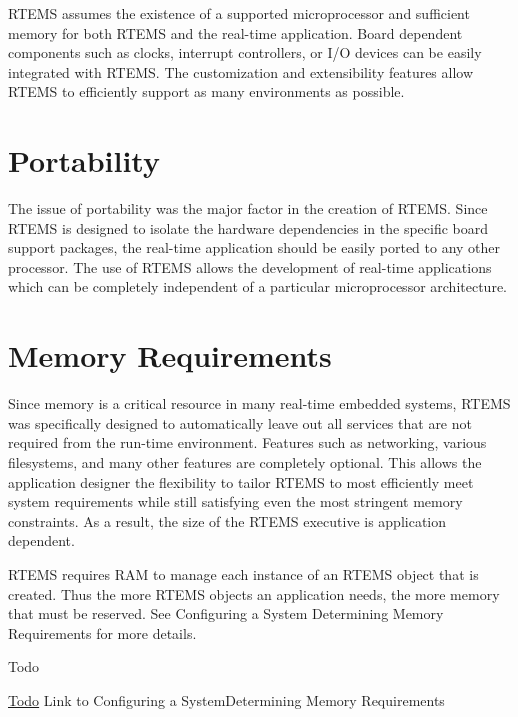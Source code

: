 R\+T\+E\+MS assumes the existence of a supported microprocessor and sufficient memory for both R\+T\+E\+MS and the real-\/time application. Board dependent components such as clocks, interrupt controllers, or I/O devices can be easily integrated with R\+T\+E\+MS. The customization and extensibility features allow R\+T\+E\+MS to efficiently support as many environments as possible.\hypertarget{RTEMSOverview_RTEMSOverviewSecPortability}{}\section{Portability}\label{RTEMSOverview_RTEMSOverviewSecPortability}
The issue of portability was the major factor in the creation of R\+T\+E\+MS. Since R\+T\+E\+MS is designed to isolate the hardware dependencies in the specific board support packages, the real-\/time application should be easily ported to any other processor. The use of R\+T\+E\+MS allows the development of real-\/time applications which can be completely independent of a particular microprocessor architecture.\hypertarget{RTEMSOverview_RTEMSOverviewSecMemoryRequirements}{}\section{Memory Requirements}\label{RTEMSOverview_RTEMSOverviewSecMemoryRequirements}
Since memory is a critical resource in many real-\/time embedded systems, R\+T\+E\+MS was specifically designed to automatically leave out all services that are not required from the run-\/time environment. Features such as networking, various filesystems, and many other features are completely optional. This allows the application designer the flexibility to tailor R\+T\+E\+MS to most efficiently meet system requirements while still satisfying even the most stringent memory constraints. As a result, the size of the R\+T\+E\+MS executive is application dependent.

R\+T\+E\+MS requires R\+AM to manage each instance of an R\+T\+E\+MS object that is created. Thus the more R\+T\+E\+MS objects an application needs, the more memory that must be reserved. See Configuring a System Determining Memory Requirements for more details.

\begin{DoxyRefDesc}{Todo}
\item[\mbox{\hyperlink{todo__todo000005}{Todo}}]Link to Configuring a System\+Determining Memory Requirements\end{DoxyRefDesc}


